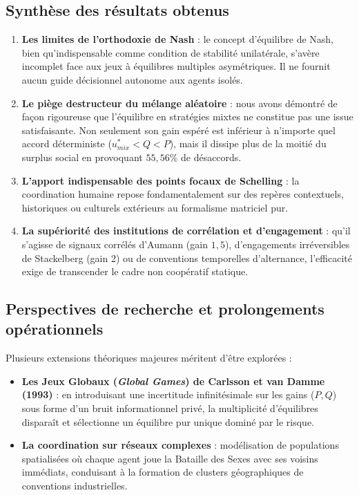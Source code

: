 \documentclass[11pt,a4paper]{article}
\begin{document}
\subsection*{Synthèse des résultats obtenus}
\begin{enumerate}[label=(\arabic*),leftmargin=1.5em]
    \item \textbf{Les limites de l'orthodoxie de Nash} : le concept d'équilibre de Nash, bien qu'indispensable comme condition de stabilité unilatérale, s'avère incomplet face aux jeux à équilibres multiples asymétriques. Il ne fournit aucun guide décisionnel autonome aux agents isolés.
    \item \textbf{Le piège destructeur du mélange aléatoire} : nous avons démontré de façon rigoureuse que l'équilibre en stratégies mixtes ne constitue pas une issue satisfaisante. Non seulement son gain espéré est inférieur à n'importe quel accord déterministe ($u_{mix}^* < Q < P$), mais il dissipe plus de la moitié du surplus social en provoquant $55{,}56\%$ de désaccords.
    \item \textbf{L'apport indispensable des points focaux de Schelling} : la coordination humaine repose fondamentalement sur des repères contextuels, historiques ou culturels extérieurs au formalisme matriciel pur.
    \item \textbf{La supériorité des institutions de corrélation et d'engagement} : qu'il s'agisse de signaux corrélés d'Aumann (gain $1{,}5$), d'engagements irréversibles de Stackelberg (gain 2) ou de conventions temporelles d'alternance, l'efficacité exige de transcender le cadre non coopératif statique.
\end{enumerate}

\subsection*{Perspectives de recherche et prolongements opérationnels}
Plusieurs extensions théoriques majeures méritent d'être explorées :
\begin{itemize}[leftmargin=1.5em]
    \item \textbf{Les Jeux Globaux (\emph{Global Games}) de Carlsson et van Damme (1993)} : en introduisant une incertitude infinitésimale sur les gains ($P, Q$) sous forme d'un bruit informationnel privé, la multiplicité d'équilibres disparaît et sélectionne un équilibre pur unique dominé par le risque.
    \item \textbf{La coordination sur réseaux complexes} : modélisation de populations spatialisées où chaque agent joue la Bataille des Sexes avec ses voisins immédiats, conduisant à la formation de clusters géographiques de conventions industrielles.
\end{itemize}
\end{document}

